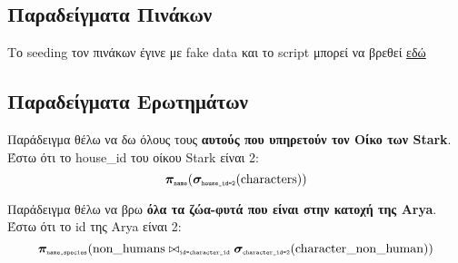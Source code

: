 \documentclass[../main.tex]{subfiles}
\begin{document}
\subsection{Παραδείγματα Πινάκων}

Το seeding τον πινάκων έγινε με fake data και το script μπορεί να βρεθεί
\href{https://github.com/johnstef99/GoT-db-auth/blob/master/laravel/got-db/database/seeders/DatabaseSeeder.php}{εδώ}



\subsection{Παραδείγματα Ερωτημάτων}

Παράδειγμα θέλω να δω όλους τους \textbf{αυτούς που υπηρετούν τον Οίκο των Stark}.
\\
Έστω ότι το house\_id του οίκου Stark είναι 2:
\begin{equation}
	\bm{\pi}_{\texttt{\tiny name}}(\bm{\sigma}_{\texttt{\tiny house\_id=2}}(\text{characters}))
\end{equation}


Παράδειγμα θέλω να βρω \textbf{όλα τα ζώα-φυτά που είναι στην κατοχή της Arya}.
\\
Έστω ότι το id της Arya είναι 2:
\begin{equation}
	\bm{\pi}_{\texttt{\tiny name,species}}(\text{non\_humans}\bowtie_{\texttt{\tiny id=character\_id}}\bm{\sigma}_{\texttt{\tiny character\_id=2}}(\text{character\_non\_human}))
\end{equation}
\end{document}
